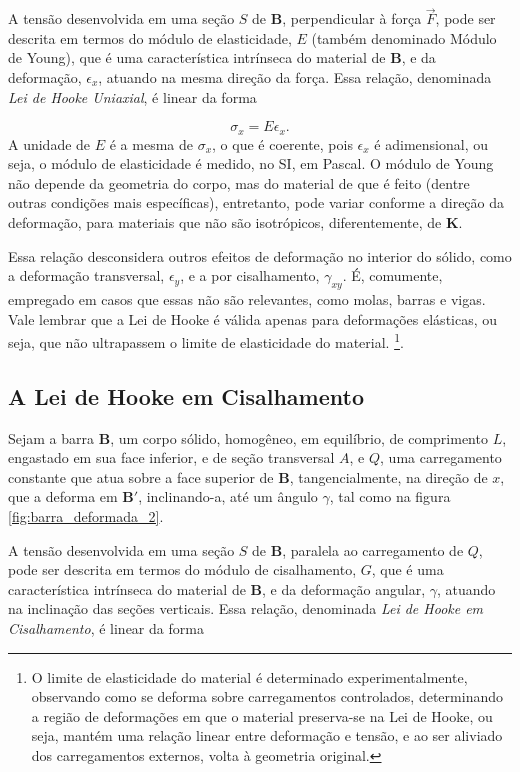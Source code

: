 A tensão desenvolvida em uma seção $S$ de $\bm{B}$, perpendicular à força $\vec{F}$, pode ser descrita em termos do módulo de elasticidade, $E$ (também denominado Módulo de Young), que é uma característica intrínseca do material de $\bm{B}$, e da deformação, $\epsilon_x$, atuando na mesma direção da força. Essa relação, denominada \emph{Lei de Hooke Uniaxial}, é linear da forma

\begin{equation}
    \sigma_x = E \epsilon_x.
\end{equation} 
A unidade de $E$ é a mesma de $\sigma_x$, o que é coerente, pois $\epsilon_x$ é adimensional, ou seja, o módulo de elasticidade é medido, no SI, em Pascal. O módulo de Young não depende da geometria do corpo, mas do material de que é feito (dentre outras condições mais específicas), entretanto, pode variar conforme a direção da deformação, para materiais que não são isotrópicos, diferentemente, de $\bm{K}$.

Essa relação desconsidera outros efeitos de deformação no interior do sólido, como a deformação transversal, $\epsilon_y$, e a por cisalhamento, $\gamma_{xy}$. É, comumente, empregado em casos que essas não são relevantes, como molas, barras e vigas. Vale lembrar que a Lei de Hooke é válida apenas para deformações elásticas, ou seja, que não ultrapassem o limite de elasticidade do material. \footnote{O limite de elasticidade do material é determinado experimentalmente, observando como se deforma sobre carregamentos controlados, determinando a região de deformações em que o material preserva-se na Lei de Hooke, ou seja, mantém uma relação linear entre deformação e tensão, e ao ser aliviado dos carregamentos externos, volta à geometria original.}.

\subsection{A Lei de Hooke em Cisalhamento}

Sejam a barra $\bm{B}$, um corpo sólido, homogêneo, em equilíbrio, de comprimento $L$, engastado em sua face inferior, e de seção transversal $A$, e $Q$, uma carregamento constante que atua sobre a face superior de $\bm{B}$, tangencialmente, na direção de $x$, que a deforma em $\bm{B}'$, inclinando-a, até um ângulo $\gamma$, tal como na figura \ref{fig:barra_deformada_2}. 

A tensão desenvolvida em uma seção $S$ de $\bm{B}$, paralela ao carregamento de  $Q$, pode ser descrita em termos do módulo de cisalhamento, $G$, que é uma característica intrínseca do material de $\bm{B}$, e da deformação angular, $\gamma$, atuando na inclinação das seções verticais. Essa relação, denominada \emph{Lei de Hooke em Cisalhamento}, é linear da forma

